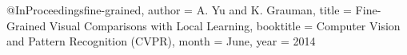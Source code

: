@InProceedings{fine-grained,
  author = {A. Yu and K. Grauman},
  title = {{F}ine-{G}rained {V}isual {C}omparisons with {L}ocal {L}earning},
  booktitle = {Computer Vision and Pattern Recognition (CVPR)},
  month = {June},
  year = {2014}
}
